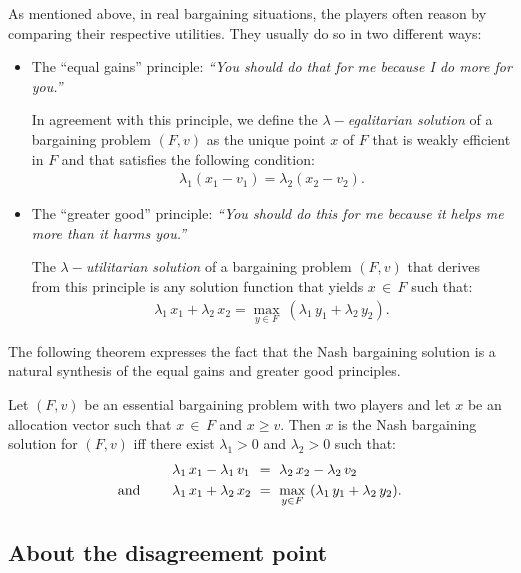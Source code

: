 As mentioned above, in real bargaining situations, the players often reason by comparing their respective utilities. They usually do so in two different ways:
\begin{itemize}
\renewcommand{\labelitemi}{$\bullet$}
	\item The ``equal gains'' principle: \emph{``You should do that for me because I do more for you.''} 
	
	In agreement with this principle, we define the \emph{$\lambda-$egalitarian solution} of a bargaining problem $(F, v)$ as the unique point $x$ of $F$ that is weakly efficient in $F$ and that satisfies the following condition:
	\begin{align*}
		\lambda_1 (x_1 - v_1) = \lambda_2 (x_2 - v_2).
	\end{align*}
	
	\item The ``greater good'' principle: \emph{``You should do this for me because it helps me more than it harms you.''}
	
	The \emph{$\lambda-$utilitarian solution} of a bargaining problem $(F, v)$ that derives from this principle is any solution function that yields $x \, \in \, F$ such that:
	\begin{align*}
		\lambda_1 \, x_1 + \lambda_2 \, x_2 = \max_{y \in F} \ (\lambda_1 \, y_1 + \lambda_2 \, y_2).
	\end{align*}
\end{itemize}
The following theorem expresses the fact that the Nash bargaining solution is a natural synthesis of the equal gains and greater good principles.

\begin{theorem}
Let $(F, v)$ be an essential bargaining problem with two players and let $x$ be an allocation vector such that $x \, \in \, F$ and $x \geq v$. Then $x$ is the Nash bargaining solution for $(F, v)$ iff there exist $\lambda_1 > 0$ and $\lambda_2 > 0$ such that:
\begin{align*}
	& \lambda_1 \, x_1 - \lambda_1 \, v_1 \hspace{.03cm} \ = \ \lambda_2 \, x_2 - \lambda_2 \, v_2  \\
	\text{and} \qquad \; & \lambda_1 \, x_1 + \lambda_2 \, x_2 \ = \ \max_{y \in F} \ (\lambda_1 \, y_1 + \lambda_2 \, y_2).
\end{align*}
\end{theorem}



\subsection{About the disagreement point} \label{sec:disagreement}



